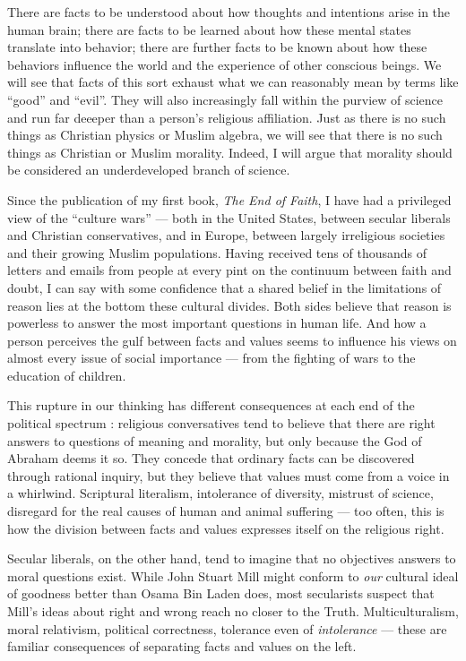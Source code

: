 \documentclass[a4paper,12pt]{extbook}
\begin{document}
There are facts to be understood about how thoughts and intentions arise in the human brain;
there are facts to be learned about how these mental states translate into behavior;
there are further facts to be known about how these behaviors influence the world and the experience of other conscious beings. 
We will see that facts of this sort exhaust what we can reasonably mean by terms like ``good'' and ``evil''. 
They will also increasingly fall within the purview of science and run far deeeper than a person's religious affiliation. 
Just as there is no such things as Christian physics or Muslim algebra, we will see that there is no such things as Christian or Muslim morality. 
Indeed, I will argue that morality should be considered an underdeveloped branch of science. 

Since the publication of my first book, \textit{The End of Faith}, I have had a privileged view of the ``culture wars'' --- both in the United States, between secular liberals and Christian conservatives, and in Europe, between largely irreligious societies and their growing Muslim populations. 
Having received tens of thousands of letters and emails from people at every pint on the continuum between faith and doubt, I can say with some confidence that a shared belief in the limitations of reason lies at the bottom these cultural divides. 
Both sides believe that reason is powerless to answer the most important questions in human life. 
And how a person perceives the gulf between facts and values seems to influence his views on almost every issue of social importance --- from the fighting of wars to the education of children. 

This rupture in our thinking has different consequences at each end of the political spectrum :
religious conversatives tend to believe that there are right answers to questions of meaning and morality, but only because the God of Abraham deems it so. 
They concede that ordinary facts can be discovered through rational inquiry, but they believe that values must come from a voice in a whirlwind. 
Scriptural literalism, intolerance of diversity, mistrust of science, disregard for the real causes of human and animal suffering --- too often, this is how the division between facts and values expresses itself on the religious right. 

Secular liberals, on the other hand, tend to imagine that no objectives answers to moral questions exist. 
While John Stuart Mill might conform to \textit{our} cultural ideal of goodness better than Osama Bin Laden does, most secularists suspect that Mill's ideas about right and wrong reach no closer to the Truth. 
Multiculturalism, moral relativism, political correctness, tolerance even of \textit{intolerance} --- these are familiar consequences of separating facts and values on the left. 
\end{document}
